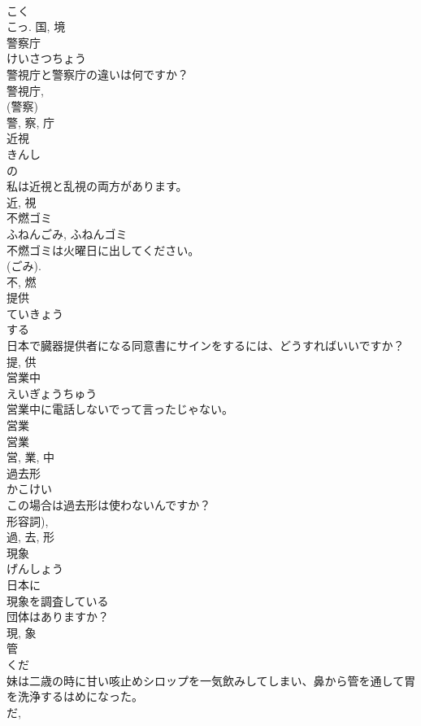 \documentclass[8pt]{extreport}
\begin{document}
\begin{CJK}{UTF8}{min}
\\	こく 
\\	こっ.	国, 境	
\\	警察庁	
\\	けいさつちょう	
\\	警視庁と警察庁の違いは何ですか？	
\\	警視庁, 
\\	(警察) 
\\	警, 察, 庁	
\\	近視	
\\	きんし	
\\	の 
\\	私は近視と乱視の両方があります。	
\\	近, 視	
\\	不燃ゴミ	
\\	ふねんごみ, ふねんゴミ	
\\	不燃ゴミは火曜日に出してください。	
\\	(ごみ). 
\\	不, 燃	
\\	提供	
\\	ていきょう	
\\	する 
\\	日本で臓器提供者になる同意書にサインをするには、どうすればいいですか？	
\\	提, 供	
\\	営業中	
\\	えいぎょうちゅう	
\\	営業中に電話しないでって言ったじゃない。	
\\	営業 
\\	営業 
\\	営, 業, 中	
\\	過去形	
\\	かこけい	
\\	この場合は過去形は使わないんですか？	
\\	形容詞), 
\\	過, 去, 形	
\\	現象	
\\	げんしょう	
\\	日本に
\\	現象を調査している
\\	団体はありますか？	
\\	現, 象	
\\	管	
\\	くだ	
\\	妹は二歳の時に甘い咳止めシロップを一気飲みしてしまい、鼻から管を通して胃を洗浄するはめになった。	
\\	だ,

\end{CJK}
\end{document}
